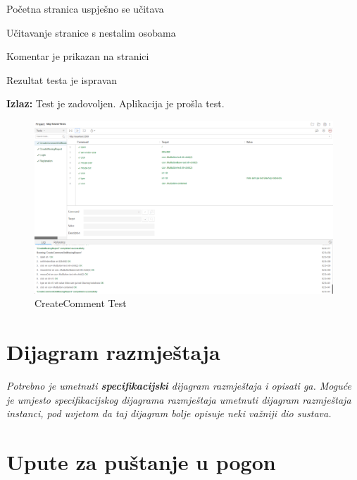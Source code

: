 			\begin{packed_enum}
				
				\item Početna stranica uspješno se učitava
				\item Učitavanje stranice s nestalim osobama
				\item Komentar je prikazan na stranici
				\item Rezultat testa je ispravan
				
			\end{packed_enum}
			
			\noindent \textbf{Izlaz:} Test je zadovoljen. Aplikacija je prošla test.
			
			\begin{figure}[H] \includegraphics[width=\linewidth]{./slike/Testovi/Selenium/Selenium_4.png}
				\caption{CreateComment Test}
			\end{figure}
			
			\eject
		
		
		\section{Dijagram razmještaja}
						
			 \textit{Potrebno je umetnuti \textbf{specifikacijski} dijagram razmještaja i opisati ga. Moguće je umjesto specifikacijskog dijagrama razmještaja umetnuti dijagram razmještaja instanci, pod uvjetom da taj dijagram bolje opisuje neki važniji dio sustava.}
			
			\eject 
		
		\section{Upute za puštanje u pogon}
		
